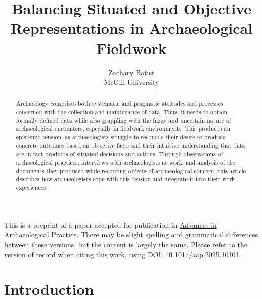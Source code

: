 \documentclass[
]{article}
\title{Balancing Situated and Objective Representations in
Archaeological Fieldwork}
\author{
      {Zachary
Batist \orcidlink{0000-0003-0435-508X} \href{mailto:zachary.batist@mcgill.ca}{\Letter}} \\
          McGill University
     \\
  }
\begin{document}
\maketitle
\begin{abstract}
Archaeology comprises both systematic and pragmatic attitudes and
processes concerned with the collection and maintenance of data. Thus,
it needs to obtain formally defined data while also grappling with the
fuzzy and uncertain nature of archaeological encounters, especially in
fieldwork environments. This produces an epistemic tension, as
archaeologists struggle to reconcile their desire to produce concrete
outcomes based on objective facts and their intuitive understanding that
data are in fact products of situated decisions and actions. Through
observations of archaeological practices, interviews with archaeologists
at work, and analysis of the documents they produced while recording
objects of archaeological concern, this article describes how
archaeologists cope with this tension and integrate it into their work
experiences.
\end{abstract}


\begin{tcolorbox}[enhanced jigsaw, breakable, bottomrule=.15mm, colbacktitle=quarto-callout-note-color!10!white, titlerule=0mm, rightrule=.15mm, leftrule=.75mm, arc=.35mm, title=\textcolor{quarto-callout-note-color}{\faInfo}\hspace{0.5em}{Note}, toprule=.15mm, toptitle=1mm, colframe=quarto-callout-note-color-frame, bottomtitle=1mm, colback=white, opacitybacktitle=0.6, coltitle=black, left=2mm, opacityback=0]

This is a preprint of a paper accepted for publication in
\href{https://www.cambridge.org/core/journals/advances-in-archaeological-practice}{Advances
in Archaeological Practice}. There may be slight spelling and
grammatical differences between these versions, but the content is
largely the same. Please refer to the version of record when citing this
work, using DOI:
\href{http://doi.org/10.1017/aap.2025.10101}{10.1017/aap.2025.10101}.

\end{tcolorbox}

\section{Introduction}\label{introduction}
\end{document}
